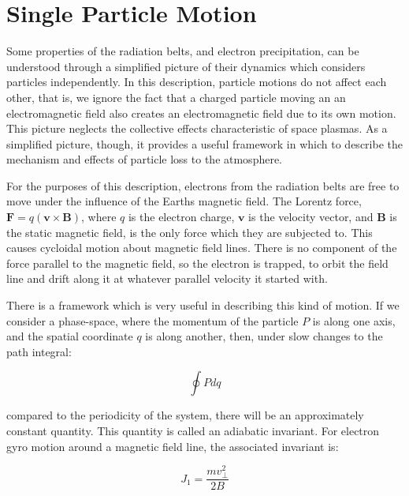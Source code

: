  \section{Single Particle Motion}
 
 Some properties of the radiation belts, and electron precipitation, can be understood through a simplified picture of their dynamics which considers particles independently. In this description, particle motions do not affect each other, that is, we ignore the fact that a charged particle moving an an electromagnetic field also creates an electromagnetic field due to its own motion. This picture neglects the collective effects characteristic of space plasmas. As a simplified picture, though, it provides a useful framework in which to describe the mechanism and effects of particle loss to the atmosphere.

For the purposes of this description, electrons from the radiation belts are free to move under the influence of the Earths magnetic field. The Lorentz force, $\mathbf{F} = q(\mathbf{v}\times\mathbf{B})$, where $q$ is the electron charge, $\mathbf{v}$ is the velocity vector, and $\mathbf{B}$ is the static magnetic field, is the only force which they are subjected to. This causes cycloidal motion about magnetic field lines. There is no component of the force parallel to the magnetic field, so the electron is trapped, to orbit the field line and drift along it at whatever parallel velocity it started with. 

There is a framework which is very useful in describing this kind of motion. If we consider a phase-space, where the momentum of the particle $P$ is along one axis, and the spatial coordinate $q$ is along another, then, under slow changes to the path integral:

$$\oint P dq$$

compared to the periodicity of the system, there will be an approximately constant quantity. This quantity is called an adiabatic invariant. For electron gyro motion around a magnetic field line, the associated invariant is:

$$J_1 = \frac{m v_{\perp}^2}{2B}$$


